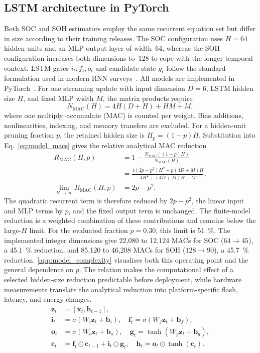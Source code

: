 \documentclass[final,3p,times]{elsarticle}
\begin{document}
\subsection{LSTM architecture in PyTorch}
Both SOC and SOH estimators employ the same recurrent equation set but differ in size according to their training releases. The SOC configuration uses $H=64$ hidden units and an MLP output layer of width~64, whereas the SOH configuration increases both dimensions to~128 to cope with the longer temporal context. LSTM gates $i_t,f_t,o_t$ and candidate state $g_t$ follow the standard formulation used in modern RNN surveys~\cite{liptonCriticalReviewRecurrent2015}. All models are implemented in PyTorch~\cite{paszkePyTorchImperativeStyle2019}.
For one streaming update with input dimension $D=6$, LSTM hidden size $H$, and fixed MLP width $M$, the matrix products require
\begin{equation}
    N_{\mathrm{MAC}}(H)=4H(D+H)+HM+M,
    \label{eq:model_macs}
\end{equation}
where one multiply--accumulate (MAC) is counted per weight. Bias additions, nonlinearities, indexing, and memory transfers are excluded. For a hidden-unit pruning fraction $p$, the retained hidden size is $H_p=(1-p)H$. Substitution into Eq.~\eqref{eq:model_macs} gives the relative analytical MAC reduction
\begin{align*}
    R_{\mathrm{MAC}}(H,p)
    &=1-\frac{N_{\mathrm{MAC}}((1-p)H)}{N_{\mathrm{MAC}}(H)}\\
    &=\frac{4(2p-p^2)H^2+p(4D+M)H}
    {4H^2+(4D+M)H+M},\\
    \lim_{H\rightarrow\infty}R_{\mathrm{MAC}}(H,p)&=2p-p^2.
\end{align*}
The quadratic recurrent term is therefore reduced by $2p-p^2$, the linear input and MLP terms by $p$, and the fixed output term is unchanged. The finite-model reduction is a weighted combination of these contributions and remains below the large-$H$ limit. For the evaluated fraction $p=0.30$, this limit is 51~\%. The implemented integer dimensions give 22,080 to 12,124 MACs for SOC ($64\rightarrow45$), a 45.1~\% reduction, and 85,120 to 46,208 MACs for SOH ($128\rightarrow90$), a 45.7~\% reduction. \ref{app:model_complexity} visualises both this operating point and the general dependence on $p$. The relation makes the computational effect of a selected hidden-size reduction predictable before deployment, while hardware measurements translate the analytical reduction into platform-specific flash, latency, and energy changes.
\begin{align}
    \mathbf{z}_t &= [\mathbf{x}_t,\mathbf{h}_{t-1}],\\
    \mathbf{i}_t &= \sigma(W_i \mathbf{z}_t + \mathbf{b}_i), \quad
    \mathbf{f}_t = \sigma(W_f \mathbf{z}_t + \mathbf{b}_f), \nonumber\\
    \mathbf{o}_t &= \sigma(W_o \mathbf{z}_t + \mathbf{b}_o), \quad
    \mathbf{g}_t = \tanh(W_g \mathbf{z}_t + \mathbf{b}_g), \nonumber\\
    \mathbf{c}_t &= \mathbf{f}_t \odot \mathbf{c}_{t-1} + \mathbf{i}_t \odot \mathbf{g}_t,\quad
    \mathbf{h}_t = \mathbf{o}_t \odot \tanh(\mathbf{c}_t). \nonumber
\end{align}
\end{document}
